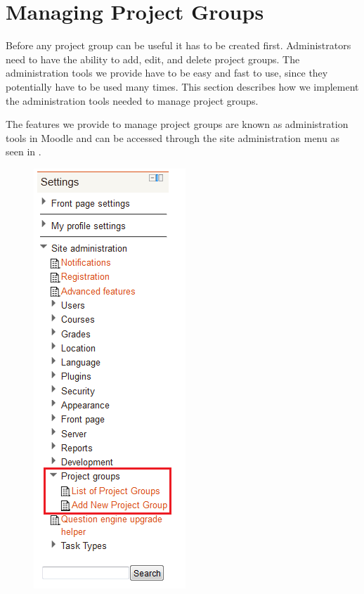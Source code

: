 \section{Managing Project Groups} %
Before any project group can be useful it has to be created first.
Administrators need to have the ability to add, edit, and delete project groups.
The administration tools we provide have to be easy and fast to use, since they potentially have to be used many times.
This section describes how we implement the administration tools needed to manage project groups.

The features we provide to manage project groups are known as administration tools in Moodle and can be accessed through the site administration menu as seen in .

\begin{figure}[htb]
	\centering
		\includegraphics[scale=0.75]{images/admin-navigation.png}
	\label{fig:navigation}
\end{figure}

